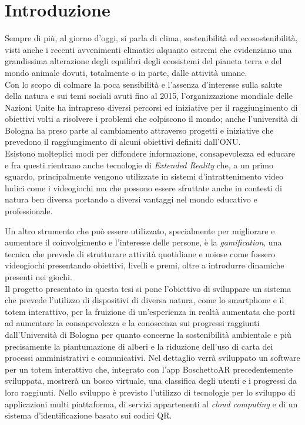 \chapter{Introduzione}

Sempre di più, al giorno d'oggi, si parla di clima, sostenibilità ed ecosostenibilità, visti anche i recenti avvenimenti climatici alquanto estremi che evidenziano una grandissima alterazione degli equilibri degli ecosistemi del pianeta terra e del mondo animale dovuti, totalmente o in parte, dalle attività umane.
\\

Con lo scopo di colmare la poca sensibilità e l'assenza d'interesse sulla salute della natura e sui temi sociali avuti fino al 2015, l'organizzazione mondiale delle Nazioni Unite ha intrapreso diversi percorsi ed iniziative per il raggiungimento di obiettivi volti a risolvere i problemi che colpiscono il mondo; anche l'università di Bologna ha preso parte al cambiamento attraverso progetti e iniziative che prevedono il raggiungimento di alcuni obiettivi definiti dall'ONU.
\\

Esistono molteplici modi per diffondere informazione, consapevolezza ed educare e fra questi rientrano anche tecnologie di \textit{Extended Reality} che, a un primo sguardo, principalmente vengono utilizzate in sistemi d'intrattenimento video ludici come i videogiochi ma che possono essere sfruttate anche in contesti di natura ben diversa portando a diversi vantaggi nel mondo educativo e professionale.

Un altro strumento che può essere utilizzato, specialmente per migliorare e aumentare il coinvolgimento e l'interesse delle persone, è la \textit{gamification}, una tecnica che prevede di strutturare attività quotidiane e noiose come fossero videogiochi presentando obiettivi, livelli e premi, oltre a introdurre dinamiche presenti nei giochi.
\\

Il progetto presentato in questa tesi si pone l'obiettivo di sviluppare un sistema che prevede l'utilizzo di dispositivi di diversa natura, come lo smartphone e il totem interattivo, per la fruizione di un'esperienza in realtà aumentata che porti ad aumentare la consapevolezza e la conoscenza sui progressi raggiunti dall'Università di Bologna per quanto concerne la sostenibilità ambientale e più precisamente la piantumazione di alberi e la riduzione dell'uso di carta dei processi amministrativi e comunicativi.
Nel dettaglio verrà sviluppato un software per un totem interattivo che, integrato con l'app BoschettoAR precedentemente sviluppata, mostrerà un bosco virtuale, una classifica degli utenti e i progressi da loro raggiunti. Nello sviluppo è previsto l'utilizzo di tecnologie per lo sviluppo di applicazioni multi piattaforma, di servizi appartenenti al \textit{cloud computing} e di un sistema d'identificazione basato sui codici QR.

